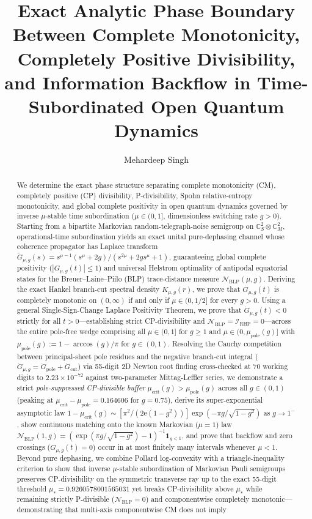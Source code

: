 \documentclass[twocolumn,10pt,amsmath,amssymb,floatfix]{revtex4-2}
\theoremstyle{plain}
\theoremstyle{definition}
\newcommand{\ee}{\mathrm{e}}
\newcommand{\NBLP}{\mathcal{N}_{\mathrm{BLP}}}
\newcommand{\IRHP}{\mathcal{I}_{\mathrm{RHP}}}
\newcommand{\mupole}{\mu_{\mathrm{pole}}}
\newcommand{\mucrit}{\mu_{\mathrm{crit}}}
\newcommand{\mustar}{\mu_*}
\begin{document}
\setlength{\emergencystretch}{3em}

\title{Exact Analytic Phase Boundary Between Complete Monotonicity, Completely Positive Divisibility, and Information Backflow in Time-Subordinated Open Quantum Dynamics}

\author{Mehardeep Singh}

\begin{abstract}
We determine the exact phase structure separating complete monotonicity (CM), completely positive (CP) divisibility, P-divisibility, Spohn relative-entropy monotonicity, and global complete positivity in open quantum dynamics governed by inverse $\mu$-stable time subordination ($\mu \in (0,1]$, dimensionless switching rate $g > 0$). Starting from a bipartite Markovian random-telegraph-noise semigroup on $\mathbb{C}^2_S \otimes \mathbb{C}^2_M$, operational-time subordination yields an exact unital pure-dephasing channel whose coherence propagator has Laplace transform $\tilde{G}_{\mu,g}(s) = s^{\mu-1}(s^\mu + 2g)/(s^{2\mu} + 2g s^\mu + 1)$, guaranteeing global complete positivity ($|G_{\mu,g}(t)| \le 1$) and universal Helstrom optimality of antipodal equatorial states for the Breuer--Laine--Piilo (BLP) trace-distance measure $\NBLP(\mu,g)$. Deriving the exact Hankel branch-cut spectral density $K_{\mu,g}(r)$, we prove that $G_{\mu,g}(t)$ is completely monotonic on $(0,\infty)$ if and only if $\mu \in (0,1/2]$ for every $g > 0$. Using a general Single-Sign-Change Laplace Positivity Theorem, we prove that $\dot{G}_{\mu,g}(t) < 0$ strictly for all $t > 0$---establishing strict CP-divisibility and $\NBLP = \IRHP = 0$---across the entire pole-free wedge comprising all $\mu \in (0,1]$ for $g \ge 1$ and $\mu \in (0,\mupole(g)]$ with $\mupole(g) := 1 - \arccos(g)/\pi$ for $g \in (0,1)$. Resolving the Cauchy competition between principal-sheet pole residues and the negative branch-cut integral ($\dot{G}_{\mu,g} = \dot{G}_{\mathrm{pole}} + \dot{G}_{\mathrm{cut}}$) via 55-digit 2D Newton root finding cross-checked at 70 working digits to $2.23 \times 10^{-72}$ against two-parameter Mittag-Leffler series, we demonstrate a strict \emph{pole-suppressed CP-divisible buffer} $\mucrit(g) > \mupole(g)$ across all $g \in (0,1)$ (peaking at $\mucrit - \mupole = 0.164606$ for $g=0.75$), derive its super-exponential asymptotic law $1 - \mucrit(g) \sim [\pi^2/(2\ee(1-g^2))]\exp(-\pi g/\sqrt{1-g^2})$ as $g \to 1^-$, show continuous matching onto the known Markovian ($\mu=1$) law $\NBLP(1,g) = (\exp(\pi g/\sqrt{1-g^2}) - 1)^{-1}\mathbf{1}_{g<1}$, and prove that backflow and zero crossings ($G_{\mu,g}(t)=0$) occur in at most finitely many intervals whenever $\mu < 1$. Beyond pure dephasing, we combine Pollard log-convexity with a triangle-inequality criterion to show that inverse $\mu$-stable subordination of Markovian Pauli semigroups preserves CP-divisibility on the symmetric transverse ray up to the exact 55-digit threshold $\mustar = 0.9260578001565031$ yet breaks CP-divisibility above $\mustar$ while remaining strictly P-divisible ($\NBLP = 0$) and componentwise completely monotonic---demonstrating that multi-axis componentwise CM does not imply 
\end{abstract}
\end{document}
